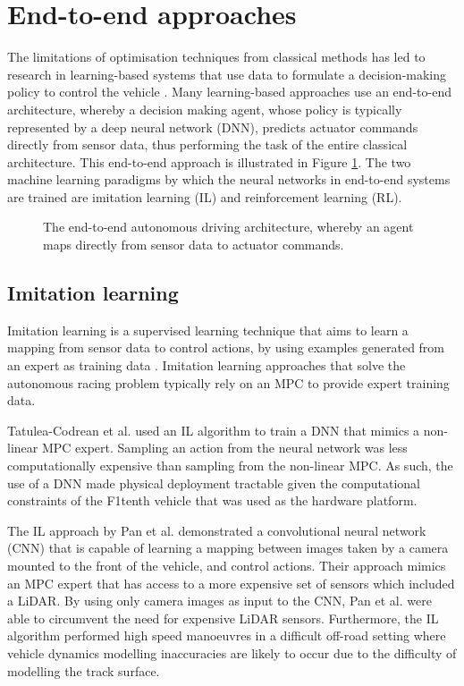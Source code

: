 \section{End-to-end approaches}
\label{sec:end_to_end}

The limitations of optimisation techniques from classical methods has led to research in learning-based systems that use data to formulate a decision-making policy to control the vehicle \cite{Fuchs2021}.
Many learning-based approaches use an end-to-end architecture, whereby a decision making agent, whose policy is typically represented by a deep neural network (DNN), predicts actuator commands directly from sensor data, thus performing the task of the entire classical architecture.
This end-to-end approach is illustrated in Figure \ref{fig:end_to_end}.
The two machine learning paradigms by which the neural networks in end-to-end systems are trained are imitation learning (IL) and reinforcement learning (RL).

\begin{figure}[h]
    \centering
    
    \caption[The end to end autonomous driving architecture]{The end-to-end autonomous driving architecture, whereby an agent maps directly from sensor data to actuator commands.}
    \label{fig:end_to_end}
\end{figure}

\subsection{Imitation learning}
\label{sec:imitation_learning}

Imitation learning is a supervised learning technique that aims to learn a mapping from sensor data to control actions, by using examples generated from an expert as training data \cite{Tatulea-Codrean2020, Pan2017a, lee2019, Osa_2018}.
Imitation learning approaches that solve the autonomous racing problem typically rely on an MPC to provide expert training data.

Tatulea-Codrean et al. \cite{Tatulea-Codrean2020} used an IL algorithm to train a DNN that mimics a non-linear MPC expert. 
Sampling an action from the neural network was less computationally expensive than sampling from the non-linear MPC. 
As such, the use of a DNN made physical deployment tractable given the computational constraints of the F1tenth vehicle that was used as the hardware platform.

The IL approach by Pan et al. \cite{Pan2017a} demonstrated a convolutional neural network (CNN) that is capable of learning a mapping between images taken by a camera mounted to the front of the vehicle, and control actions.
Their approach mimics an MPC expert that has access to a more expensive set of sensors which included a LiDAR.
By using only camera images as input to the CNN, Pan et al. \cite{Pan2017a} were able to circumvent the need for expensive LiDAR sensors.
Furthermore, the IL algorithm performed high speed manoeuvres in a difficult off-road setting where vehicle dynamics modelling inaccuracies are likely to occur due to the difficulty of modelling the track surface.

